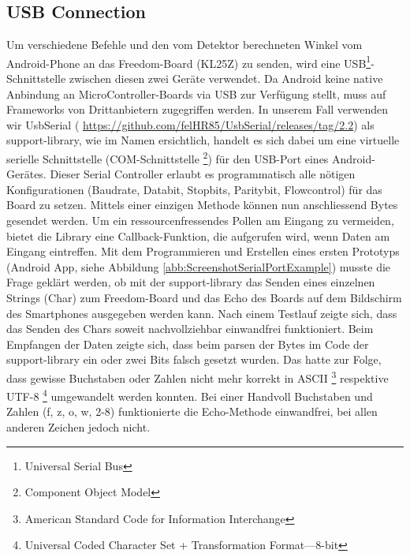 \subsection{USB Connection}
Um verschiedene Befehle und den vom Detektor berechneten Winkel vom Android-Phone an das Freedom-Board (KL25Z) 
zu senden, wird eine USB\footnote{Universal Serial Bus}-Schnittstelle zwischen diesen zwei Geräte verwendet.
\newline
Da Android keine native Anbindung an MicroController-Boards via USB zur Verfügung stellt, muss auf 
Frameworks von Drittanbietern zugegriffen werden. In unserem Fall verwenden wir UsbSerial (
\url{https://github.com/felHR85/UsbSerial/releases/tag/2.2}) als support-library, wie im Namen ersichtlich, 
handelt es sich dabei um eine virtuelle serielle Schnittstelle (COM-Schnittstelle \footnote{Component Object Model})
für den USB-Port eines Android-Gerätes. Dieser Serial Controller erlaubt es programmatisch alle nötigen Konfigurationen 
(Baudrate, Databit, Stopbits, Paritybit, Flowcontrol) für das Board zu setzen. Mittels einer einzigen 
Methode können nun anschliessend Bytes gesendet werden. Um ein ressourcenfressendes Pollen am Eingang zu vermeiden, 
bietet die Library eine Callback-Funktion, die aufgerufen wird, wenn Daten am Eingang eintreffen.
\newline
Mit dem Programmieren und Erstellen eines ersten Prototyps (Android App, siehe Abbildung \ref{abb:ScreenshotSerialPortExample}) musste die Frage geklärt werden, 
ob mit der support-library das Senden eines einzelnen Strings (Char) zum Freedom-Board und das Echo des 
Boards auf dem Bildschirm des Smartphones ausgegeben werden kann. Nach einem Testlauf zeigte sich, dass
das Senden des Chars soweit nachvollziehbar einwandfrei funktioniert. Beim Empfangen der Daten zeigte 
sich, dass beim parsen der Bytes im Code der support-library ein oder zwei Bits falsch gesetzt wurden. 
Das hatte zur Folge, dass gewisse Buchstaben oder Zahlen nicht mehr korrekt in ASCII 
\footnote{American Standard Code for Information Interchange} respektive UTF-8 
\footnote{Universal Coded Character Set + Transformation Format—8-bit}
umgewandelt werden konnten. Bei einer Handvoll Buchstaben und Zahlen (f, z, o, w, 2-8) funktionierte die
Echo-Methode einwandfrei, bei allen anderen Zeichen jedoch nicht.
\newline
